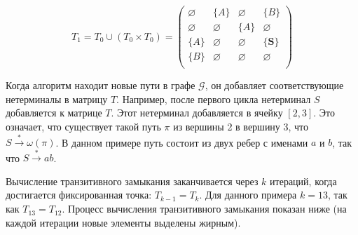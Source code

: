 \begin{example}
\[
T_1 = T_0 \cup (T_0 \times T_0) = \begin{pmatrix}
    \varnothing & \{A\}       & \varnothing & \{B\}       \\
    \varnothing & \varnothing & \{A\}       & \varnothing \\
    \{A\}       & \varnothing & \varnothing & \{\pmb{S}\}       \\
    \{B\}       & \varnothing & \varnothing & \varnothing \\
\end{pmatrix}
\]

Когда алгоритм находит новые пути в графе $\mathcal{G}$, он добавляет соответствующие нетерминалы в матрицу $T$. Например, после первого цикла нетерминал $S$ добавляется к матрице $T$. Этот нетерминал добавляется в ячейку $[2,3]$. Это означает, что существует такой путь $\pi$ из вершины 2 в вершину 3, что $S \xrightarrow{*} \omega(\pi)$. В данном примере путь состоит из двух ребер с именами $a$ и $b$, так что $S \xrightarrow{*} ab$.

Вычисление транзитивного замыкания заканчивается через $k$ итераций, когда достигается фиксированная точка: $T_{k-1} = T_k$. Для данного примера $k = 13$, так как $T_{13} = T_{12}$. Процесс вычисления транзитивного замыкания показан ниже (на каждой итерации новые элементы выделены жирным).



\end{example}

